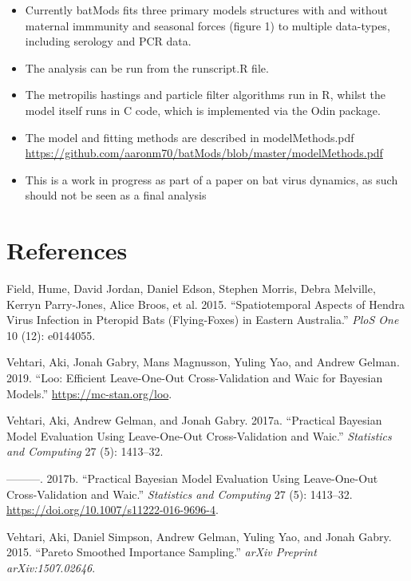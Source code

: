 \documentclass[
]{article}
\newlength{\cslhangindent}
\newenvironment{cslreferences}%
  {\setlength{\parindent}{0pt}%
  \everypar{\setlength{\hangindent}{\cslhangindent}}\ignorespaces}%
  {\par}
\begin{document}
\begin{itemize}
\item
  Currently batMods fits three primary models structures with and
  without maternal immmunity and seasonal forces (figure 1) to multiple
  data-types, including serology and PCR data.
\item
  The analysis can be run from the runscript.R file.
\item
  The metropilis hastings and particle filter algorithms run in R,
  whilst the model itself runs in C code, which is implemented via the
  Odin package.
\item
  The model and fitting methods are described in modelMethods.pdf
  \url{https://github.com/aaronm70/batMods/blob/master/modelMethods.pdf}
\item
  This is a work in progress as part of a paper on bat virus dynamics,
  as such should not be seen as a final analysis
\end{itemize}

\hypertarget{references}{%
\section*{References}\label{references}}

\hypertarget{refs}{}
\begin{cslreferences}
\leavevmode\hypertarget{ref-field2015spatiotemporal}{}%
Field, Hume, David Jordan, Daniel Edson, Stephen Morris, Debra Melville,
Kerryn Parry-Jones, Alice Broos, et al. 2015. ``Spatiotemporal Aspects
of Hendra Virus Infection in Pteropid Bats (Flying-Foxes) in Eastern
Australia.'' \emph{PloS One} 10 (12): e0144055.

\leavevmode\hypertarget{ref-VehtariLooPackage}{}%
Vehtari, Aki, Jonah Gabry, Mans Magnusson, Yuling Yao, and Andrew
Gelman. 2019. ``Loo: Efficient Leave-One-Out Cross-Validation and Waic
for Bayesian Models.'' \url{https://mc-stan.org/loo}.

\leavevmode\hypertarget{ref-vehtari2017practical}{}%
Vehtari, Aki, Andrew Gelman, and Jonah Gabry. 2017a. ``Practical
Bayesian Model Evaluation Using Leave-One-Out Cross-Validation and
Waic.'' \emph{Statistics and Computing} 27 (5): 1413--32.

\leavevmode\hypertarget{ref-AkiLoo}{}%
---------. 2017b. ``Practical Bayesian Model Evaluation Using
Leave-One-Out Cross-Validation and Waic.'' \emph{Statistics and
Computing} 27 (5): 1413--32.
\url{https://doi.org/10.1007/s11222-016-9696-4}.

\leavevmode\hypertarget{ref-vehtari2015pareto}{}%
Vehtari, Aki, Daniel Simpson, Andrew Gelman, Yuling Yao, and Jonah
Gabry. 2015. ``Pareto Smoothed Importance Sampling.'' \emph{arXiv
Preprint arXiv:1507.02646}.
\end{cslreferences}
\end{document}
